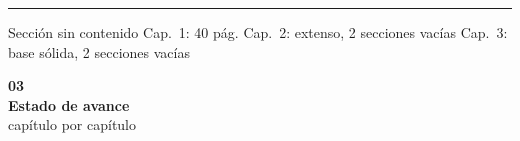 \documentclass[11pt, aspectratio=169, spanish]{beamer}
\begin{document}
\begin{frame}[plain]
\begin{center}
\end{center}

\vspace{0.05cm}
\begin{center}
{\scriptsize
\textcolor{GrisFondo!20!black}{\rule{0.3cm}{0.3cm}}\;\textcolor{GrisClaro!80!black}{Sección sin contenido}\qquad
\textcolor{AzulInfo}{\faSquare}\; Cap.~1: 40 pág.\qquad
\textcolor{MoradoMarco}{\faSquare}\; Cap.~2: extenso, 2 secciones vacías\qquad
\textcolor{VerdeUNAL}{\faSquare}\; Cap.~3: base sólida, 2 secciones vacías}
\end{center}

\end{frame}

\begin{frame}[plain]
\vspace*{1.0cm}
\begin{center}
{\fontsize{40}{48}\selectfont\textcolor{VerdeUNAL!40}{\textbf{03}}}\\[-0.1cm]
{\Large\textbf{Estado de avance}}\\[0.05cm]
{\normalsize\textcolor{GrisClaro!80!black}{capítulo por capítulo}}
\end{center}
\end{frame}
\end{document}
